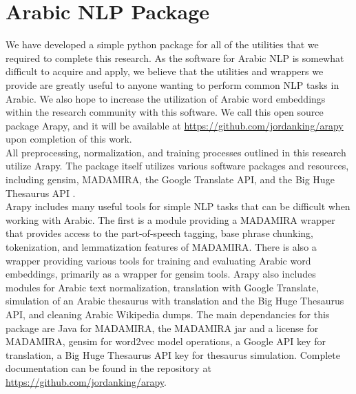 \section{Arabic NLP Package}
\label{sec:arapy}

We have developed a simple python package for all of the utilities that we required to complete this research. As the software for Arabic NLP is somewhat difficult to acquire and apply, we believe that the utilities and wrappers we provide are greatly useful to anyone wanting to perform common NLP tasks in Arabic. We also hope to increase the utilization of Arabic word embeddings within the research community with this software. We call this open source package Arapy, and it will be available at \url{https://github.com/jordanking/arapy} upon completion of this work. 
\\
All preprocessing, normalization, and training processes outlined in this research utilize Arapy. The package itself utilizes various software packages and resources, including gensim, MADAMIRA, the Google Translate API, and the Big Huge Thesaurus API \cite{rehurek_lrec,pasha:2014,google:online,bhl:online}.
\\
Arapy includes many useful tools for simple NLP tasks that can be difficult when working with Arabic. The first is a module providing a MADAMIRA wrapper that provides access to the part-of-speech tagging, base phrase chunking, tokenization, and lemmatization features of MADAMIRA. There is also a wrapper providing various tools for training and evaluating Arabic word embeddings, primarily as a wrapper for gensim tools. Arapy also includes modules for Arabic text normalization, translation with Google Translate, simulation of an Arabic thesaurus with translation and the Big Huge Thesaurus API, and cleaning Arabic Wikipedia dumps. The main dependancies for this package are Java for MADAMIRA, the MADAMIRA jar and a license for MADAMIRA, gensim for word2vec model operations, a Google API key for translation, a Big Huge Thesaurus API key for thesaurus simulation. Complete documentation can be found in the repository at \url{https://github.com/jordanking/arapy}.
